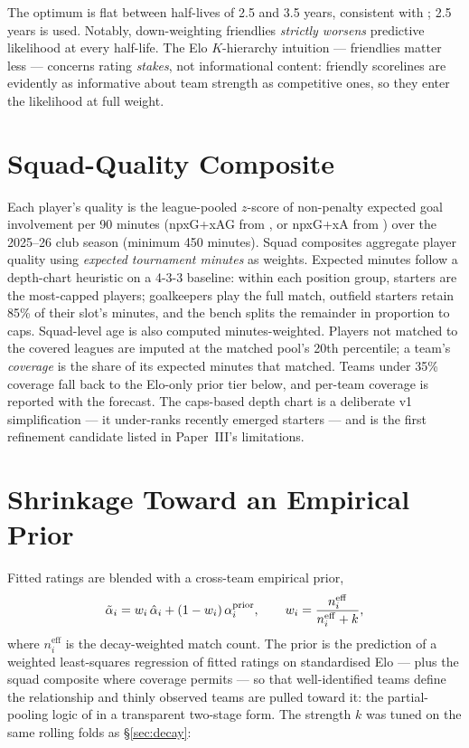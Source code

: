 \documentclass[11pt]{article}
\begin{document}
The optimum is flat between half-lives of 2.5 and 3.5 years, consistent with
\citet{leyetal2019}; 2.5 years is used. Notably, down-weighting friendlies
\emph{strictly worsens} predictive likelihood at every half-life. The Elo
$K$-hierarchy intuition --- friendlies matter less --- concerns rating
\emph{stakes}, not informational content: friendly scorelines are evidently as
informative about team strength as competitive ones, so they enter the
likelihood at full weight.

\section{Squad-Quality Composite}\label{sec:squad}
Each player's quality is the league-pooled $z$-score of non-penalty expected
goal involvement per 90 minutes (npxG+xAG from \cite{fbref}, or npxG+xA from
\cite{understat}) over the 2025--26 club season (minimum 450 minutes). Squad composites
aggregate player quality using \emph{expected tournament minutes} as weights.
Expected minutes follow a depth-chart heuristic on a 4-3-3 baseline: within
each position group, starters are the most-capped players; goalkeepers play
the full match, outfield starters retain 85\% of their slot's minutes, and the
bench splits the remainder in proportion to caps. Squad-level age is also
computed minutes-weighted. Players not matched to the covered leagues are
imputed at the matched pool's 20th percentile; a team's \emph{coverage} is the
share of its expected minutes that matched. Teams under 35\% coverage fall
back to the Elo-only prior tier below, and per-team coverage is reported with
the forecast. The caps-based depth chart is a deliberate v1 simplification ---
it under-ranks recently emerged starters --- and is the first refinement
candidate listed in Paper~III's limitations.

\section{Shrinkage Toward an Empirical Prior}\label{sec:shrink}
Fitted ratings are blended with a cross-team empirical prior,
\begin{equation}
  \tilde{\alpha}_i = w_i\, \hat{\alpha}_i + (1 - w_i)\, \alpha_i^{\mathrm{prior}},
  \qquad
  w_i = \frac{n_i^{\mathrm{eff}}}{n_i^{\mathrm{eff}} + k},
\end{equation}
where $n_i^{\mathrm{eff}}$ is the decay-weighted match count. The prior is the
prediction of a weighted least-squares regression of fitted ratings on
standardised Elo --- plus the squad composite where coverage permits --- so that
well-identified teams define the relationship and thinly observed teams are
pulled toward it: the partial-pooling logic of \citet{baioblangiardo2010} in a
transparent two-stage form. The strength $k$ was tuned on the same rolling
folds as \S\ref{sec:decay}:
\end{document}
